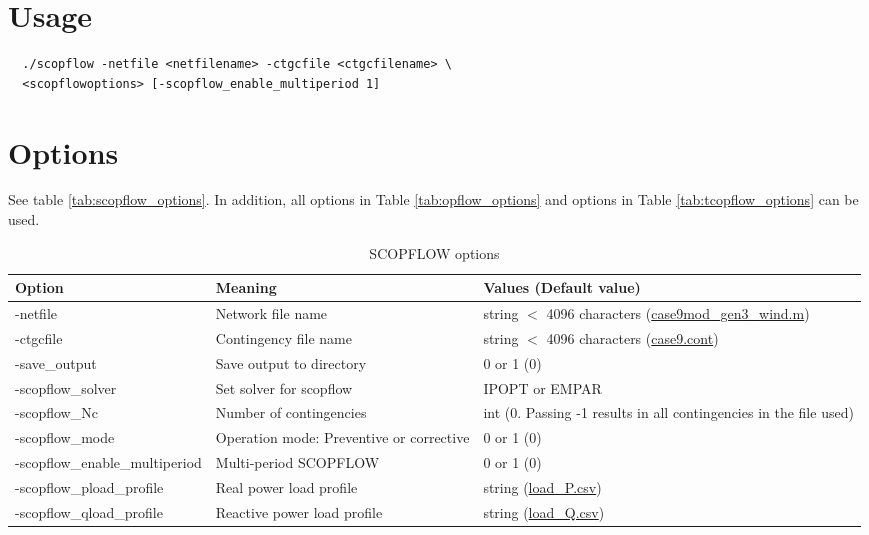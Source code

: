 \section{Usage}

\begin{lstlisting}
  ./scopflow -netfile <netfilename> -ctgcfile <ctgcfilename> \
  <scopflowoptions> [-scopflow_enable_multiperiod 1]
\end{lstlisting}

\section{Options}
See table \ref{tab:scopflow_options}. In addition, all \opflow options in Table \ref{tab:opflow_options} and \tcopflow options in Table \ref{tab:tcopflow_options} can be used.
\begin{table}[!htbp]
  \caption{SCOPFLOW options}
  \small
  \begin{tabular}{|p{}|p{}|p{}|}
    \hline
    \textbf{Option} & \textbf{Meaning} & \textbf{Values (Default value)} \\ \hline
    -netfile & Network file name & string $<$ 4096 characters (\href{https://gitlab.pnnl.gov/exasgd/frameworks/exago/-/blob/master/datafiles/case9/case9mod_gen3_wind.m}{case9mod\_gen3\_wind.m}) \\ \hline
    -ctgcfile & Contingency file name & string $<$ 4096 characters (\href{https://gitlab.pnnl.gov/exasgd/frameworks/exago/-/blob/master/datafiles/case9/case9.cont}{case9.cont}) \\ \hline
    -save\_output & Save output to directory & 0 or 1 (0) \\ \hline
    -scopflow\_solver & Set solver for scopflow & IPOPT or EMPAR \\ \hline
    -scopflow\_Nc & Number of contingencies & int (0. Passing -1 results in all contingencies in the file used) \\ \hline
    -scopflow\_mode & Operation mode: Preventive or corrective & 0 or 1 (0) \\ \hline
    -scopflow\_enable\_multiperiod & Multi-period SCOPFLOW & 0 or 1 (0) \\ \hline
    -scopflow\_pload\_profile & Real power load profile & string (\href{https://gitlab.pnnl.gov/exasgd/frameworks/exago/-/blob/master/datafiles/case9/load_P.csv}{load\_P.csv}) \\ \hline
    -scopflow\_qload\_profile & Reactive power load profile & string (\href{https://gitlab.pnnl.gov/exasgd/frameworks/exago/-/blob/master/datafiles/case9/load_Q.csv}{load\_Q.csv}) \\ \hline

\end{tabular}
\end{table}
